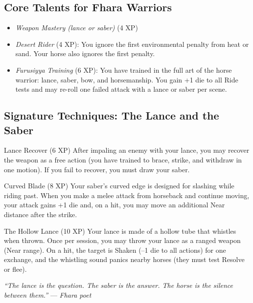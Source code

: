 \documentclass[9pt,a5paper]{extbook}
\begin{document}
\subsection{Core Talents for Fhara Warriors}
\begin{itemize}
    \item \textit{Weapon Mastery (lance or saber)} (4 XP)
    \item \textit{Desert Rider} (4 XP): You ignore the first environmental penalty from heat or sand. Your horse also ignores the first penalty.
    \item \textit{Furusiyya Training} (6 XP): You have trained in the full art of the horse warrior: lance, saber, bow, and horsemanship. You gain +1 die to all Ride tests and may re-roll one failed attack with a lance or saber per scene.
\end{itemize}

\subsection{Signature Techniques: The Lance and the Saber}

\begin{talentbox}{Lance Recover (6 XP)}
After impaling an enemy with your lance, you may recover the weapon as a free action (you have trained to brace, strike, and withdraw in one motion). If you fail to recover, you must draw your saber.
\end{talentbox}

\begin{talentbox}{Curved Blade (8 XP)}
Your saber's curved edge is designed for slashing while riding past. When you make a melee attack from horseback and continue moving, your attack gains +1 die and, on a hit, you may move an additional Near distance after the strike.
\end{talentbox}

\begin{talentbox}{The Hollow Lance (10 XP)}
Your lance is made of a hollow tube that whistles when thrown. Once per session, you may throw your lance as a ranged weapon (Near range). On a hit, the target is Shaken (--1 die to all actions) for one exchange, and the whistling sound panics nearby horses (they must test Resolve or flee).
\end{talentbox}

\vspace{0.2cm}
\noindent\textit{``The lance is the question. The saber is the answer. The horse is the silence between them.''}  
\hfill --- \textit{Fhara poet}
\end{document}
